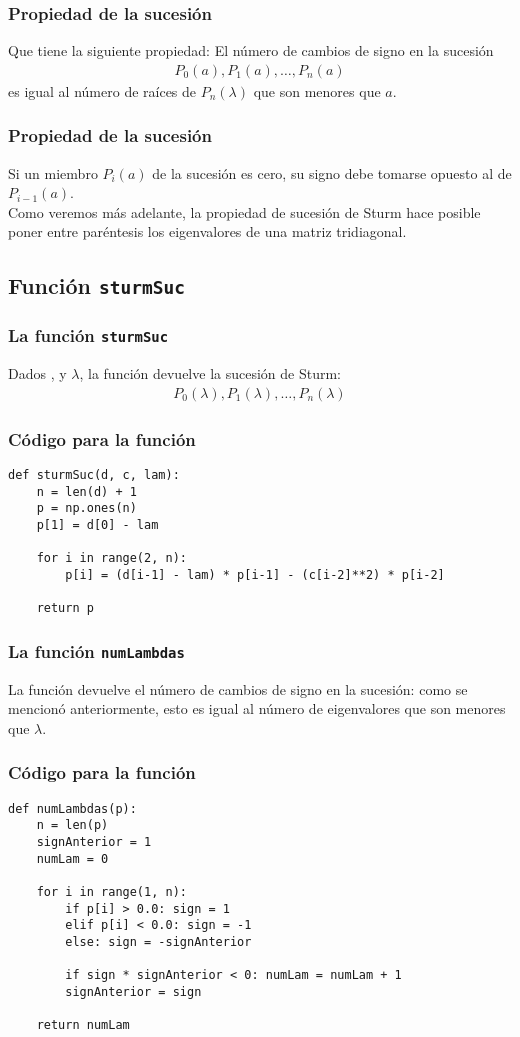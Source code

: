 \documentclass[12pt]{beamer}
\begin{document}
\begin{frame}
\frametitle{Propiedad de la sucesión}
Que tiene la siguiente propiedad: \pause El número de cambios de signo en la sucesión
\begin{align*}
P_{0} (a), P_{1} (a), \ldots, P_{n} (a)
\end{align*}
es igual al número de raíces de $P_{n} (\lambda)$ que son menores que $a$.
\end{frame}
\begin{frame}
\frametitle{Propiedad de la sucesión}
Si un miembro $P_{i} (a)$ de la sucesión es cero, su signo debe tomarse opuesto al de $P_{i-1} (a)$.
\\
\bigskip
\pause
Como veremos más adelante, la propiedad de sucesión de Sturm hace posible poner entre paréntesis los eigenvalores de una matriz tridiagonal.
\end{frame}

\subsection{Función \texttt{sturmSuc}}

\begin{frame}
\frametitle{La función \texttt{sturmSuc}}
Dados ,  y $\lambda$, la función  devuelve la sucesión de Sturm:
\pause
\begin{align*}
P_{0} (\lambda), P_{1} (\lambda) , \ldots, P_{n} (\lambda)
\end{align*}
\end{frame}
\begin{frame}
\frametitle{Código para la función}
\begin{lstlisting}[caption=La función sturmSuc]
def sturmSuc(d, c, lam):
    n = len(d) + 1
    p = np.ones(n)
    p[1] = d[0] - lam
    
    for i in range(2, n):
        p[i] = (d[i-1] - lam) * p[i-1] - (c[i-2]**2) * p[i-2]
    
    return p
\end{lstlisting}
\end{frame}
\begin{frame}
\frametitle{La función \texttt{numLambdas}}
La función  devuelve el número de cambios de signo en la sucesión: \pause como se mencionó anteriormente, esto es igual al número de eigenvalores que son menores que $\lambda$.
\end{frame}
\begin{frame}
\frametitle{Código para la función}
\begin{lstlisting}[caption=La función numLambdas]
def numLambdas(p):
    n = len(p)
    signAnterior = 1
    numLam = 0
    
    for i in range(1, n):
        if p[i] > 0.0: sign = 1
        elif p[i] < 0.0: sign = -1
        else: sign = -signAnterior
        
        if sign * signAnterior < 0: numLam = numLam + 1
        signAnterior = sign
    
    return numLam
\end{lstlisting}
\end{frame}
\end{document}
